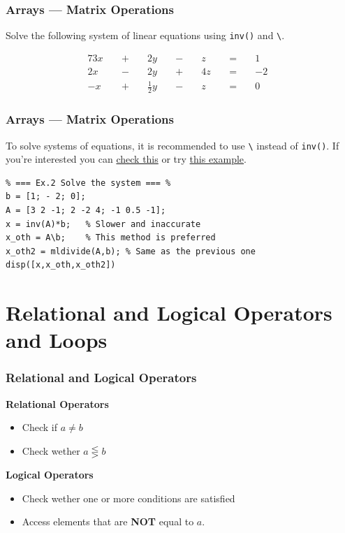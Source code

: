 \documentclass[11pt,xcolor={svgnames},aspectratio=169,usepdftitle=false,notheorems]{beamer}
\begin{document}
\begin{frame}[fragile]
    \frametitle{Arrays --- Matrix Operations}
\begin{exercise} 
Solve the following system of linear equations using \verb;inv(); and \verb;\;.

\begin{alignat*}{7}
3x&& \; + \; &&2y&& \; - \; &&z&& \; = \; &&1&\\
2x&& \; - \; &&2y&& \; + \; &&4z&& \; = \; &&-2&\\
-x&& \; + \; &&{\tfrac {1}{2}}y&& \; - \; &&z&& \; = \; &&0&
\end{alignat*}
\end{exercise}
\end{frame}

\begin{frame}[fragile]
    \frametitle{Arrays --- Matrix Operations}
To solve systems of equations, it is recommended to use \verb;\; instead of \verb;inv();. If you're interested you can \href{https://www.mathworks.com/matlabcentral/answers/139778-what-is-the-difference-between-inv-and-the-backslash#answer_143286}{check this} or try \href{https://www.mathworks.com/help/matlab/ref/inv.html#bu6sfy8-1}{this example}.
\begin{lstlisting}
% === Ex.2 Solve the system === %
b = [1; - 2; 0];
A = [3 2 -1; 2 -2 4; -1 0.5 -1];
x = inv(A)*b;   % Slower and inaccurate
x_oth = A\b;    % This method is preferred
x_oth2 = mldivide(A,b); % Same as the previous one
disp([x,x_oth,x_oth2])
\end{lstlisting}
\end{frame}

\section{Relational and Logical Operators and Loops}

\begin{frame}
    \frametitle{Relational and Logical Operators}
    \alert{\textbf{Relational Operators}}
\begin{itemize}
    \item Check if $a\neq b$
    \item Check wether $a \lesseqgtr b$
\end{itemize}

\alert{\textbf{Logical Operators}}
\begin{itemize}
    \item Check wether one or more conditions are satisfied
    \item Access elements that are \alert{\textbf{NOT}} equal to $a$.
\end{itemize}
\end{frame}
\end{document}
